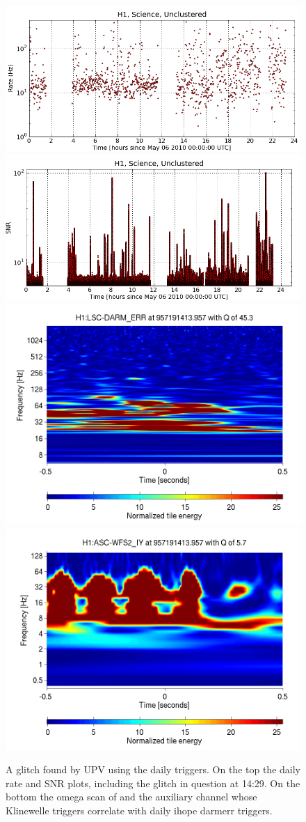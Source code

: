 \begin{figure}
  \includegraphics[width=0.5\linewidth]{figures/detchar/20100506_H1_0_UNCLUSTERED_rate_vs_time}
  \includegraphics[width=0.5\linewidth]{figures/detchar/20100506_H1_0_UNCLUSTERED_snr_vs_time} \\
  \includegraphics[width=0.5\linewidth]{figures/detchar/957191413_957191417_H1_LSC-DARM_ERR_1_00_spectrogram_whitened}
  \includegraphics[width=0.5\linewidth]{figures/detchar/957191413_957191417_H1_ASC-WFS2_IY_1_00_spectrogram_whitened}
  \caption[Glitch found by UPV using the daily triggers]{
  \label{f:daily_upv}
A glitch found by UPV using the daily triggers.  On the top the daily
rate and SNR plots, including the glitch in question at 14:29.  On the
bottom the omega scan of \darmerr and the auxiliary channel whose Klinewelle
triggers correlate with daily ihope darmerr triggers.}
\end{figure}%

